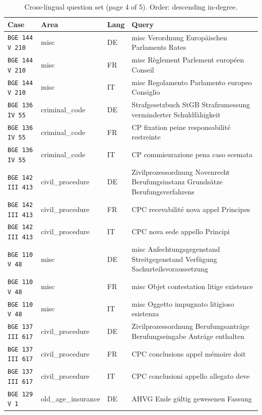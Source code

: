 \begin{table}[h]
\centering
\caption{Cross-lingual question set (page 4 of 5). Order: descending in-degree.}
\scriptsize
\setlength{\tabcolsep}{2pt}
\begin{tabular}{>{\raggedright\arraybackslash}p{2.2cm} >{\raggedright\arraybackslash}p{3.55cm} >{\raggedright\arraybackslash}p{0.8cm} >{\raggedright\arraybackslash}p{8.05cm}}
\toprule
\textbf{Case} & \textbf{Area} & \textbf{Lang} & \textbf{Query} \\
\midrule
\texttt{BGE 144 V 210} & misc & DE & misc Verordnung Europäischen Parlaments Rates \\
\texttt{BGE 144 V 210} & misc & FR & misc Règlement Parlement européen Conseil \\
\texttt{BGE 144 V 210} & misc & IT & misc Regolamento Parlamento europeo Consiglio \\
\texttt{BGE 136 IV 55} & criminal\_code & DE & Strafgesetzbuch StGB Strafzumessung verminderter Schuldfähigkeit \\
\texttt{BGE 136 IV 55} & criminal\_code & FR & CP fixation peine responsabilité restreinte \\
\texttt{BGE 136 IV 55} & criminal\_code & IT & CP commisurazione pena caso scemata \\
\texttt{BGE 142 III 413} & civil\_procedure & DE & Zivilprozessordnung Novenrecht Berufungsinstanz Grundsätze Berufungsverfahrens \\
\texttt{BGE 142 III 413} & civil\_procedure & FR & CPC recevabilité nova appel Principes \\
\texttt{BGE 142 III 413} & civil\_procedure & IT & CPC nova sede appello Principi \\
\texttt{BGE 110 V 48} & misc & DE & misc Anfechtungsgegenstand Streitgegenstand Verfügung Sachurteilsvoraussetzung \\
\texttt{BGE 110 V 48} & misc & FR & misc Objet contestation litige existence \\
\texttt{BGE 110 V 48} & misc & IT & misc Oggetto impugnato litigioso esistenza \\
\texttt{BGE 137 III 617} & civil\_procedure & DE & Zivilprozessordnung Berufungsanträge Berufungseingabe Anträge enthalten \\
\texttt{BGE 137 III 617} & civil\_procedure & FR & CPC conclusions appel mémoire doit \\
\texttt{BGE 137 III 617} & civil\_procedure & IT & CPC conclusioni appello allegato deve \\
\texttt{BGE 129 V 1} & old\_age\_insurance & DE & AHVG Ende gültig gewesenen Fassung \\

\end{tabular}
\end{table}
